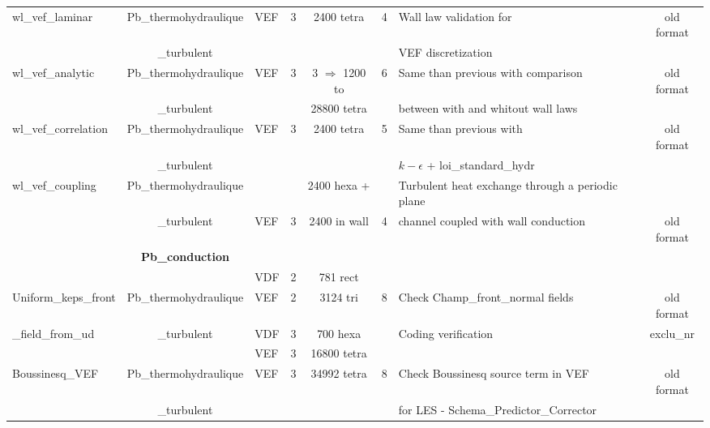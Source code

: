 \begin{table}[H]
\begin{centering}
\begin{tabular}{lclccclc}
\hline
\rowcolor{Blue!10}wl\_vef\_laminar & Pb\_thermohydraulique & VEF & 3 & 2400 tetra & 4 & Wall law validation for & old format \\ 
\rowcolor{Blue!10} & \_turbulent & & & & & VEF discretization & \\
\hline
\rowcolor{Blue!10}wl\_vef\_analytic & Pb\_thermohydraulique & VEF & 3 & 3 $\Rightarrow$ 1200 to  & 6 & Same than previous with comparison & old format \\ 
\rowcolor{Blue!10} & \_turbulent & & & 28800 tetra & & between with and whitout wall laws &  \\
\hline
\rowcolor{Blue!10}wl\_vef\_correlation & Pb\_thermohydraulique & VEF & 3 & 2400 tetra & 5 & Same than previous with & old format \\ 
\rowcolor{Blue!10} & \_turbulent & & & & &  $k-\epsilon$ + loi\_standard\_hydr & \\
\hline
\rowcolor{Blue!10}wl\_vef\_coupling & Pb\_thermohydraulique & & & 2400 hexa + & & Turbulent heat exchange through a periodic plane & \\ 
\rowcolor{Blue!10} & \_turbulent & VEF & 3 & 2400 in wall & 4 & channel coupled with wall conduction & old format \\ 
\rowcolor{Blue!10} & \textbf{Pb\_conduction} & & & & & & \\
\hline
\rowcolor{Blue!10} & & VDF & 2 & 781 rect & & & \\
\rowcolor{Blue!10}Uniform\_keps\_front & Pb\_thermohydraulique & VEF & 2 & 3124 tri & 8 & Check Champ\_front\_normal fields & old format \\ 
\rowcolor{Blue!10}\_field\_from\_ud & \_turbulent & VDF & 3 & 700 hexa & & Coding verification & exclu\_nr\\ 
\rowcolor{Blue!10} & & VEF & 3 & 16800 tetra & & & \\
\hline
\rowcolor{Blue!10}Boussinesq\_VEF & Pb\_thermohydraulique & VEF & 3 & 34992 tetra & 8 & Check Boussinesq source term in VEF & old format \\ 
\rowcolor{Blue!10} & \_turbulent & & & & & for LES - Schema\_Predictor\_Corrector & \\
\hline
\end{tabular}
\end{centering}
\end{table}

\newpage

